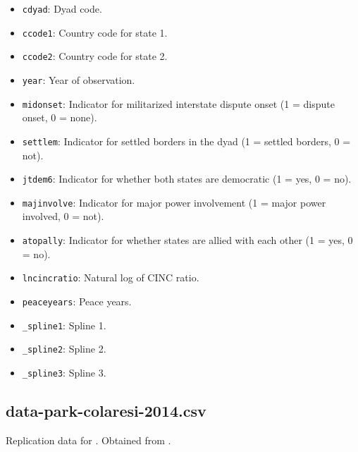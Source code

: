 \documentclass[12pt]{article}
\begin{document}
\begin{itemize}
  \item \texttt{cdyad}: Dyad code.
  \item \texttt{ccode1}: Country code for state 1.
  \item \texttt{ccode2}: Country code for state 2. 
  \item \texttt{year}: Year of observation.
  \item \texttt{midonset}: Indicator for militarized interstate dispute onset (1 = dispute onset, 0 = none).
  \item \texttt{settlem}: Indicator for settled borders in the dyad (1 = settled borders, 0 = not).
  \item \texttt{jtdem6}: Indicator for whether both states are democratic (1 = yes, 0 = no).
  \item \texttt{majinvolve}: Indicator for major power involvement (1 = major power involved, 0 = not).
  \item \texttt{atopally}: Indicator for whether states are allied with each other (1 = yes, 0 = no).
  \item \texttt{lncincratio}: Natural log of CINC ratio.
  \item \texttt{peaceyears}: Peace years.
  \item \texttt{\_spline1}: Spline 1.
  \item \texttt{\_spline2}: Spline 2.
  \item \texttt{\_spline3}: Spline 3.
\end{itemize}


\subsection{data-park-colaresi-2014.csv}

Replication data for \citet{Park:2014gg}.
Obtained from \citet{park2014data}.
\end{document}
